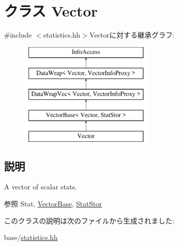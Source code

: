 \hypertarget{classStats_1_1Vector}{
\section{クラス Vector}
\label{classStats_1_1Vector}
}


{\ttfamily \#include $<$statistics.hh$>$}Vectorに対する継承グラフ:\begin{figure}[H]
\begin{center}
\leavevmode
\includegraphics[height=5cm]{classStats_1_1Vector}
\end{center}
\end{figure}


\subsection{説明}
A vector of scalar stats. \begin{DoxySeeAlso}{参照}
Stat, \hyperlink{classStats_1_1VectorBase}{VectorBase}, \hyperlink{classStats_1_1StatStor}{StatStor} 
\end{DoxySeeAlso}


このクラスの説明は次のファイルから生成されました:\begin{DoxyCompactItemize}
\item 
base/\hyperlink{statistics_8hh}{statistics.hh}\end{DoxyCompactItemize}

